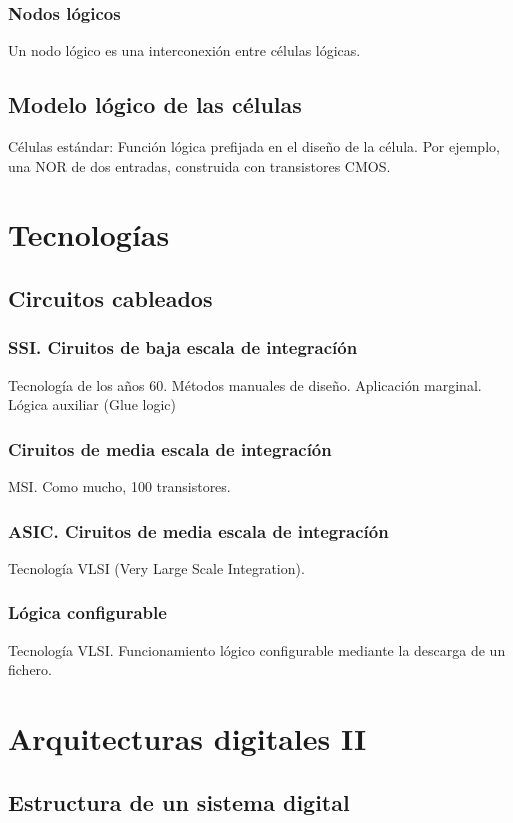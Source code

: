 \documentclass[a4paper]{book}
\begin{document}
\subsubsection{Nodos lógicos}
Un nodo lógico es una interconexión entre células lógicas.

\subsection{Modelo lógico de las células}
Células estándar: Función lógica prefijada en el diseño de la célula. Por ejemplo, una NOR de dos entradas, construida con transistores CMOS.


\section{Tecnologías}
\subsection{Circuitos cableados}
\subsubsection{SSI. Ciruitos de baja escala de integracíón}
Tecnología de los años 60. Métodos manuales de diseño. Aplicación marginal. Lógica auxiliar (Glue logic)
\subsubsection{Ciruitos de media escala de integracíón}
MSI.
Como mucho, 100 transistores.
\subsubsection{ASIC. Ciruitos de media escala de integracíón}
Tecnología VLSI (Very Large Scale Integration).

\subsubsection{Lógica configurable}
Tecnología VLSI.
Funcionamiento lógico configurable mediante la descarga de un fichero.
\section{Arquitecturas digitales II}

\subsection{Estructura de un sistema digital}
\end{document}
